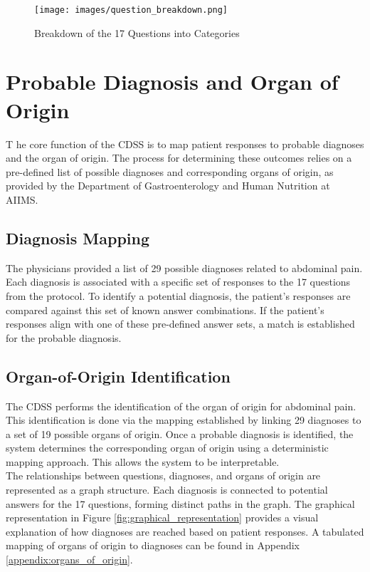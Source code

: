 \begin{figure}[H]
    \centering
    \texttt{[image: images/question\_breakdown.png]}
    \caption{Breakdown of the 17 Questions into Categories}
    \label{fig:question_breakdown}
\end{figure}

\section{Probable Diagnosis and Organ of Origin}
\lettrine{T}{ }he core function of the CDSS is to map patient responses to probable diagnoses and the organ of origin. The process for determining these outcomes relies on a pre-defined list of possible diagnoses and corresponding organs of origin, as provided by the Department of Gastroenterology and Human Nutrition at AIIMS.

\subsection{Diagnosis Mapping}
The physicians provided a list of 29 possible diagnoses related to abdominal pain. Each diagnosis is associated with a specific set of responses to the 17 questions from the protocol. To identify a potential diagnosis, the patient's responses are compared against this set of known answer combinations. If the patient's responses align with one of these pre-defined answer sets, a match is established for the probable diagnosis.

\subsection{Organ-of-Origin Identification}
The CDSS performs the identification of the organ of origin for abdominal pain. This identification is done via the mapping established by linking 29 diagnoses to a set of 19 possible organs of origin. Once a probable diagnosis is identified, the system determines the corresponding organ of origin using a \textcolor{TUMBlue}{deterministic mapping} approach. This allows the system to be interpretable.\\[\baselineskip]

\noindent The relationships between questions, diagnoses, and organs of origin are represented as a graph structure. Each diagnosis is connected to potential answers for the 17 questions, forming distinct paths in the graph. The graphical representation in Figure \ref{fig:graphical_representation} provides a visual explanation of how diagnoses are reached based on patient responses. A tabulated mapping of organs of origin to diagnoses can be found in Appendix \ref{appendix:organs_of_origin}.\\[\baselineskip]

